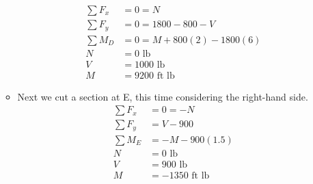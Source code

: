 \documentclass[12pt, oneside]{article}
\begin{document}
\begin{enumerate}
\begin{itemize}
			\begin{align*}
				\sum F_x &= 0 = N\\
				\sum F_y &= 0 = 1800 - 800 - V\\
				\sum M_D &= 0 = M + 800(2) - 1800(6)\\
				N &= 0 \text{ lb}\\
				V &= 1000\text{ lb}\\
				M &= 9200\text{ ft lb}
			\end{align*}
		\item Next we cut a section at E, this time considering the right-hand side.
			\begin{align*}
				\sum F_x &= 0 = -N\\
				\sum F_y &= V - 900\\
				\sum M_E &= -M -900(1.5)\\
				N &= 0 \text{ lb }\\
				V &= 900 \text{ lb } \\
				M &= -1350 \text{ ft lb }
			\end{align*}
		\end{itemize}
	

\end{enumerate}
\end{document}
